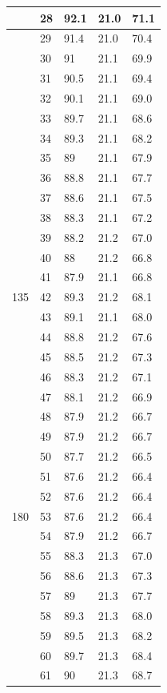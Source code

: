 \documentclass[a4paper,11pt,uplatex]{jsarticle}
\begin{document}
\begin{longtable}{lllll}
 & 28 & 92.1 & 21.0 & 71.1 \\ \hline
 & 29 & 91.4 & 21.0 & 70.4 \\ \hline
 & 30 & 91 & 21.1 & 69.9 \\ \hline
 & 31 & 90.5 & 21.1 & 69.4 \\ \hline
 & 32 & 90.1 & 21.1 & 69.0 \\ \hline
 & 33 & 89.7 & 21.1 & 68.6 \\ \hline
 & 34 & 89.3 & 21.1 & 68.2 \\ \hline
 & 35 & 89 & 21.1 & 67.9 \\ \hline
 & 36 & 88.8 & 21.1 & 67.7 \\ \hline
 & 37 & 88.6 & 21.1 & 67.5 \\ \hline
 & 38 & 88.3 & 21.1 & 67.2 \\ \hline
 & 39 & 88.2 & 21.2 & 67.0 \\ \hline
 & 40 & 88 & 21.2 & 66.8 \\ \hline
 & 41 & 87.9 & 21.1 & 66.8 \\ \hline
135 & 42 & 89.3 & 21.2 & 68.1 \\ \hline
 & 43 & 89.1 & 21.1 & 68.0 \\ \hline
 & 44 & 88.8 & 21.2 & 67.6 \\ \hline
 & 45 & 88.5 & 21.2 & 67.3 \\ \hline
 & 46 & 88.3 & 21.2 & 67.1 \\ \hline
 & 47 & 88.1 & 21.2 & 66.9 \\ \hline
 & 48 & 87.9 & 21.2 & 66.7 \\ \hline
 & 49 & 87.9 & 21.2 & 66.7 \\ \hline
 & 50 & 87.7 & 21.2 & 66.5 \\ \hline
 & 51 & 87.6 & 21.2 & 66.4 \\ \hline
 & 52 & 87.6 & 21.2 & 66.4 \\ \hline
180 & 53 & 87.6 & 21.2 & 66.4 \\ \hline
 & 54 & 87.9 & 21.2 & 66.7 \\ \hline
 & 55 & 88.3 & 21.3 & 67.0 \\ \hline
 & 56 & 88.6 & 21.3 & 67.3 \\ \hline
 & 57 & 89 & 21.3 & 67.7 \\ \hline
 & 58 & 89.3 & 21.3 & 68.0 \\ \hline
 & 59 & 89.5 & 21.3 & 68.2 \\ \hline
 & 60 & 89.7 & 21.3 & 68.4 \\ \hline
 & 61 & 90 & 21.3 & 68.7 \\ \hline

\end{longtable}
\end{document}
